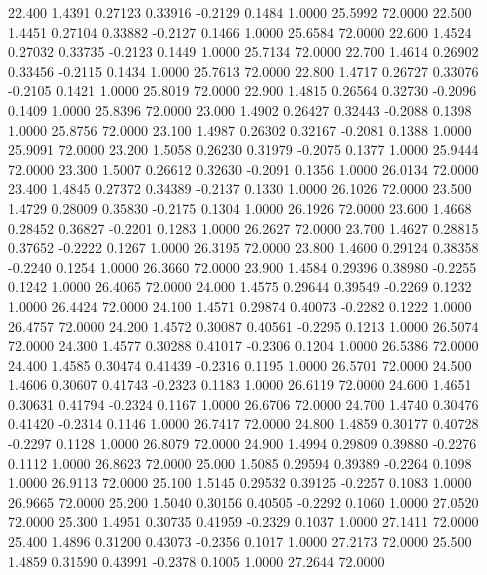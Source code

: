   22.400   1.4391   0.27123   0.33916  -0.2129   0.1484   1.0000  25.5992  72.0000
  22.500   1.4451   0.27104   0.33882  -0.2127   0.1466   1.0000  25.6584  72.0000
  22.600   1.4524   0.27032   0.33735  -0.2123   0.1449   1.0000  25.7134  72.0000
  22.700   1.4614   0.26902   0.33456  -0.2115   0.1434   1.0000  25.7613  72.0000
  22.800   1.4717   0.26727   0.33076  -0.2105   0.1421   1.0000  25.8019  72.0000
  22.900   1.4815   0.26564   0.32730  -0.2096   0.1409   1.0000  25.8396  72.0000
  23.000   1.4902   0.26427   0.32443  -0.2088   0.1398   1.0000  25.8756  72.0000
  23.100   1.4987   0.26302   0.32167  -0.2081   0.1388   1.0000  25.9091  72.0000
  23.200   1.5058   0.26230   0.31979  -0.2075   0.1377   1.0000  25.9444  72.0000
  23.300   1.5007   0.26612   0.32630  -0.2091   0.1356   1.0000  26.0134  72.0000
  23.400   1.4845   0.27372   0.34389  -0.2137   0.1330   1.0000  26.1026  72.0000
  23.500   1.4729   0.28009   0.35830  -0.2175   0.1304   1.0000  26.1926  72.0000
  23.600   1.4668   0.28452   0.36827  -0.2201   0.1283   1.0000  26.2627  72.0000
  23.700   1.4627   0.28815   0.37652  -0.2222   0.1267   1.0000  26.3195  72.0000
  23.800   1.4600   0.29124   0.38358  -0.2240   0.1254   1.0000  26.3660  72.0000
  23.900   1.4584   0.29396   0.38980  -0.2255   0.1242   1.0000  26.4065  72.0000
  24.000   1.4575   0.29644   0.39549  -0.2269   0.1232   1.0000  26.4424  72.0000
  24.100   1.4571   0.29874   0.40073  -0.2282   0.1222   1.0000  26.4757  72.0000
  24.200   1.4572   0.30087   0.40561  -0.2295   0.1213   1.0000  26.5074  72.0000
  24.300   1.4577   0.30288   0.41017  -0.2306   0.1204   1.0000  26.5386  72.0000
  24.400   1.4585   0.30474   0.41439  -0.2316   0.1195   1.0000  26.5701  72.0000
  24.500   1.4606   0.30607   0.41743  -0.2323   0.1183   1.0000  26.6119  72.0000
  24.600   1.4651   0.30631   0.41794  -0.2324   0.1167   1.0000  26.6706  72.0000
  24.700   1.4740   0.30476   0.41420  -0.2314   0.1146   1.0000  26.7417  72.0000
  24.800   1.4859   0.30177   0.40728  -0.2297   0.1128   1.0000  26.8079  72.0000
  24.900   1.4994   0.29809   0.39880  -0.2276   0.1112   1.0000  26.8623  72.0000
  25.000   1.5085   0.29594   0.39389  -0.2264   0.1098   1.0000  26.9113  72.0000
  25.100   1.5145   0.29532   0.39125  -0.2257   0.1083   1.0000  26.9665  72.0000
  25.200   1.5040   0.30156   0.40505  -0.2292   0.1060   1.0000  27.0520  72.0000
  25.300   1.4951   0.30735   0.41959  -0.2329   0.1037   1.0000  27.1411  72.0000
  25.400   1.4896   0.31200   0.43073  -0.2356   0.1017   1.0000  27.2173  72.0000
  25.500   1.4859   0.31590   0.43991  -0.2378   0.1005   1.0000  27.2644  72.0000
